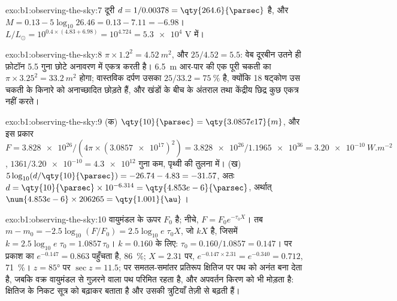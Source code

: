 \begin{solution}{exo:b1:observing-the-sky:7}
दूरी $d = 1/0.00378 = \qty{264.6}{\parsec}$ है, और 
$M = 0.13 - 5\log_{10}26.46 = 0.13 - 7.11 = -6.98$। $L/L_\odot = 10^{0.4\times(4.83 + 6.98)} =
10^{4.724} = \num{5.3e4}$ V में।
\end{solution}

\begin{solution}{exo:b1:observing-the-sky:8}
$\pi\times1.2^2 = \qty{4.52}{m^2}$, और $25/4.52 = 5.5$: वेब दूरबीन उतने ही फ़ोटॉन 5.5 गुना छोटे
अनावरण में एकत्र करती है। \qty{6.5}{m} आर-पार की एक पूरी चकती का $\pi\times3.25^2 = \qty{33.2}{m^2}$
होगा; वास्तविक दर्पण उसका $25/33.2 = \qty{75}{\percent}$ है, क्योंकि 18 षट्कोण उस चकती के किनारे को
अनाच्छादित छोड़ते हैं, और खंडों के बीच के अंतराल तथा केंद्रीय छिद्र कुछ एकत्र नहीं करते।
\end{solution}

\begin{solution}{exo:b1:observing-the-sky:9}
(क) $\qty{10}{\parsec} = \qty{3.0857e17}{m}$, और इस प्रकार $F = \num{3.828e26}/(4\pi
\times(\num{3.0857e17})^2) = \num{3.828e26}/\num{1.1965e36} =
\qty{3.20e-10}{W.m^{-2}}$, $1361/\num{3.20e-10} = \num{4.3e12}$ गुना कम, पृथ्वी की तुलना में।
(ख) $5\log_{10}(d/\qty{10}{\parsec}) = -26.74 - 4.83 = -31.57$, अतः
$d = \qty{10}{\parsec}\times10^{-6.314} = \qty{4.853e-6}{\parsec}$, अर्थात्
$\num{4.853e-6}\times206265 = \qty{1.001}{\au}$।
\end{solution}

\begin{solution}{exo:b1:observing-the-sky:10}
वायुमंडल के ऊपर  $F_0$ है; नीचे, $F = F_0e^{-\tau_0X}$। तब
$m - m_0 = -2.5\log_{10}(F/F_0) = 2.5\log_{10}e\;\tau_0X$, जो $kX$ है, जिसमें
$k = 2.5\log_{10}e\;\tau_0 = 1.0857\,\tau_0$। $k = 0.160$ के लिए:
$\tau_0 = 0.160/1.0857 = 0.147$।  पर प्रकाश का $e^{-0.147} = 0.863$ पहुँचता है, \qty{86}{\percent};
$X = 2.31$ पर, $e^{-0.147\times2.31} =
e^{-0.340} = 0.712$, \qty{71}{\percent}। $z = \ang{85}$ पर $\sec z =
11.5$; पर समतल-समांतर प्रतिरूप क्षितिज पर पथ को अनंत बना देता है, जबकि वक्र वायुमंडल से
गुज़रने वाला पथ परिमित रहता है, और अपवर्तन किरण को भी मोड़ता है: क्षितिज के निकट सूत्र 
को बढ़ाकर बताता है और उसकी त्रुटियाँ तेज़ी से बढ़ती हैं।
\end{solution}

